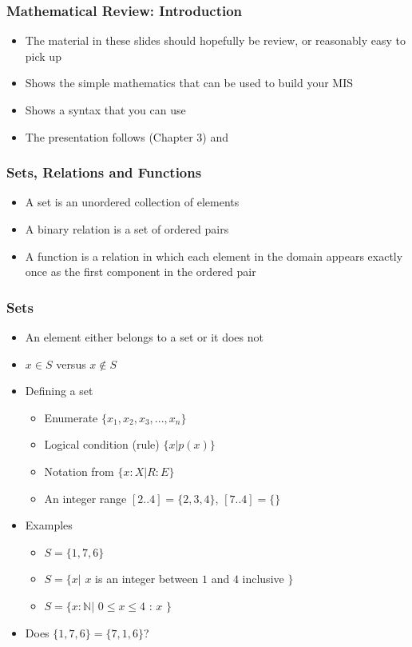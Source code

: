 \documentclass[t,12pt,numbers,fleqn]{beamer}
\begin{document}

\begin{frame}
\frametitle{Mathematical Review: Introduction}
\begin{itemize}
\item The material in these slides should hopefully be review, or
  reasonably easy to pick up
\item Shows the simple mathematics that can be used to build your MIS
\item Shows a syntax that you can use
\item The presentation follows \cite{HoffmanAndStrooper1995} (Chapter
  3) and \cite{GriesAndSchneider1993}
\end{itemize}
\end{frame}


\begin{frame}
\frametitle{Sets, Relations and Functions}
\begin{itemize}
\item A set is an unordered collection of elements
\item A binary relation is a set of ordered pairs
\item A function is a relation in which each element in the domain
  appears exactly once as the first component in the ordered pair
\end{itemize}
\end{frame}


\begin{frame}
\frametitle{Sets}
\begin{itemize}
\item An element either belongs to a set or it does not
\item $x \in S$ versus $x \notin S$
\item Defining a set
\begin{itemize}
\item Enumerate $\{ x_1, x_2, x_3, ..., x_n \}$
\item Logical condition (rule) $\{x | p(x) \}$
\item Notation from \cite{GriesAndSchneider1993} $\{x: X | R : E \}$
\item An integer range $[2 .. 4] = \{2, 3, 4\}$, $[7 .. 4] = \{\}$
\end{itemize}
\item Examples
\begin{itemize}
\item $S = \{ 1, 7, 6 \}$
\item $S = \{ x |$ $x$ is an integer between $1$ and $4$ inclusive
  $\}$
\item $S = \{ x: \mathbb{N} |$ $0 \leq x \leq 4$ : $x$ $\}$
\end{itemize}
\item Does $\{ 1, 7, 6 \} = \{ 7, 1, 6 \}$?
\end{itemize}
\end{frame}
\end{document}
